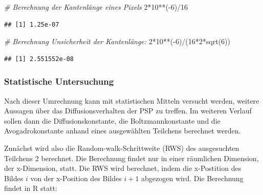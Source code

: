 \documentclass[
  9pt,
]{article}
\newenvironment{Shaded}{\begin{snugshade}}{\end{snugshade}}
\newcommand{\CommentTok}[1]{\textcolor[rgb]{0.56,0.35,0.01}{\textit{#1}}}
\newcommand{\DecValTok}[1]{\textcolor[rgb]{0.00,0.00,0.81}{#1}}
\newcommand{\FunctionTok}[1]{\textcolor[rgb]{0.00,0.00,0.00}{#1}}
\newcommand{\NormalTok}[1]{#1}
\newcommand{\SpecialCharTok}[1]{\textcolor[rgb]{0.00,0.00,0.00}{#1}}
\begin{document}
\begin{Shaded}
\begin{Highlighting}[]
\CommentTok{\# Berechnung der Kantenlänge eines Pixels}
\DecValTok{2}\SpecialCharTok{*}\DecValTok{10}\SpecialCharTok{**}\NormalTok{(}\SpecialCharTok{{-}}\DecValTok{6}\NormalTok{)}\SpecialCharTok{/}\DecValTok{16}
\end{Highlighting}
\end{Shaded}

\begin{verbatim}
## [1] 1.25e-07
\end{verbatim}

\begin{Shaded}
\begin{Highlighting}[]
\CommentTok{\# Berechnung Unsicherheit der Kantenlänge:}
\DecValTok{2}\SpecialCharTok{*}\DecValTok{10}\SpecialCharTok{**}\NormalTok{(}\SpecialCharTok{{-}}\DecValTok{6}\NormalTok{)}\SpecialCharTok{/}\NormalTok{(}\DecValTok{16}\SpecialCharTok{*}\DecValTok{2}\SpecialCharTok{*}\FunctionTok{sqrt}\NormalTok{(}\DecValTok{6}\NormalTok{))}
\end{Highlighting}
\end{Shaded}

\begin{verbatim}
## [1] 2.551552e-08
\end{verbatim}

\hypertarget{statistische-untersuchung}{%
\subsubsection{Statistische
Untersuchung}\label{statistische-untersuchung}}

Nach dieser Umrechnung kann mit statistischen Mitteln versucht werden,
weitere Aussagen über das Diffusionsverhalten der PSP zu treffen. Im
weiteren Verlauf sollen dann die Diffusionskonstante, die
Boltzmannkonstante und die Avogadrokonstante anhand eines ausgewählten
Teilchens berechnet werden.

Zunächst wird also die Random-walk-Schrittweite (RWS) des ausgesuchten
Teilchens 2 berechnet. Die Berechnung findet nur in einer räumlichen
Dimension, der x-Dimension, statt. Die RWS wird berechnet, indem die
x-Postition des Bildes \(i\) von der x-Position des Bildes \(i+1\)
abgezogen wird. Die Berechnung findet in R statt:
\end{document}

